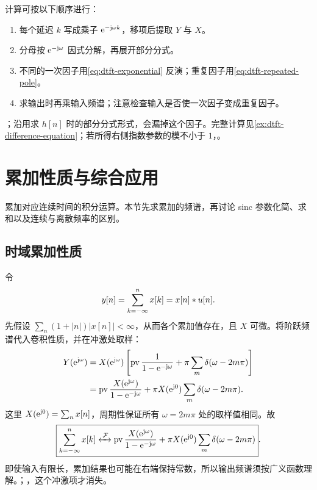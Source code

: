 计算可按以下顺序进行：
\begin{enumerate}
  \item 每个延迟 $k$ 写成乘子 $\mathrm{e}^{-\mathrm{j}\omega k}$，移项后提取 $Y$ 与 $X$。
  \item 分母按 $\mathrm{e}^{-\mathrm{j}\omega}$ 因式分解，再展开部分分式。
  \item 不同的一次因子用\cref{eq:dtft-exponential} 反演；重复因子用\cref{eq:dtft-repeated-pole}。
  \item 求输出时再乘输入频谱；注意检查输入是否使一次因子变成重复因子。
\end{enumerate}
；沿用求 $h[n]$ 时的部分分式形式，会漏掉这个因子。完整计算见\cref{ex:dtft-difference-equation}；若所得右侧指数参数的模不小于 $1$，。

\section{累加性质与综合应用}
\label{sec:dtft-pair-tips}

累加对应连续时间的积分运算。本节先求累加的频谱，再讨论 sinc 参数化简、求和以及连续与离散频率的区别。

\subsection{时域累加性质}
\label{sec:dtft-accumulation}

令
\[
  y[n]=\sum_{k=-\infty}^{n}x[k]=x[n]\mathbin{\ast}u[n].
\]
先假设 $\sum_n(1+|n|)|x[n]|<\infty$，从而各个累加值存在，且 $X$ 可微。将阶跃频谱代入卷积性质，并在冲激处取样：
\begin{align*}
  Y(\mathrm{e}^{\mathrm{j}\omega})
    &=X(\mathrm{e}^{\mathrm{j}\omega})\left[
        \operatorname{pv}\frac1{1-\mathrm{e}^{-\mathrm{j}\omega}}
        +\pi\sum_m\delta(\omega-2m\pi)\right]\\
    &=\operatorname{pv}\frac{X(\mathrm{e}^{\mathrm{j}\omega})}{1-\mathrm{e}^{-\mathrm{j}\omega}}
        +\pi X(\mathrm{e}^{\mathrm{j}0})\sum_m\delta(\omega-2m\pi).
\end{align*}
这里 $X(\mathrm{e}^{\mathrm{j}0})=\sum_n x[n]$，周期性保证所有 $\omega=2m\pi$ 处的取样值相同。故
\begin{equation}
  \boxed{\sum_{k=-\infty}^{n}x[k]\mathrel{\xleftrightarrow{\,\mathcal{F}\,}}
    \operatorname{pv}\frac{X(\mathrm{e}^{\mathrm{j}\omega})}{1-\mathrm{e}^{-\mathrm{j}\omega}}
    +\pi X(\mathrm{e}^{\mathrm{j}0})\sum_m\delta(\omega-2m\pi)}.
  \label{eq:dtft-accumulation}
\end{equation}
即使输入有限长，累加结果也可能在右端保持常数，所以输出频谱须按广义函数理解。；，这个冲激项才消失。

